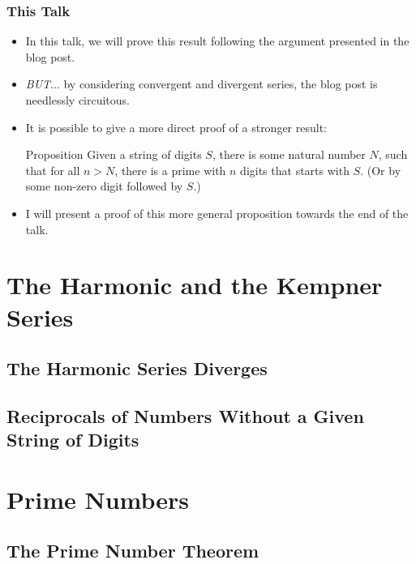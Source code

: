 \documentclass{beamer}
\begin{document}
\begin{frame}
    \frametitle{This Talk}

    \begin{itemize}
        \item In this talk, we will prove this result following the argument presented in the blog post. \pause
        \item \emph{BUT}... by considering convergent and divergent series, the blog post is needlessly circuitous. \pause
        \item It is possible to give a more direct proof of a stronger result:
        \begin{block}{Proposition}
            Given a string of digits $S$, there is some natural number $N$, such that for all $n > N$, there is a prime with $n$ digits that starts with $S$. (Or by some non-zero digit followed by $S$.)
        \end{block} \pause
        \item I will present a proof of this more general proposition towards the end of the talk.
    \end{itemize}    

\end{frame}

\section{The Harmonic and the Kempner Series}
\subsection{The Harmonic Series Diverges}
\subsection{Reciprocals of Numbers Without a Given String of Digits}

\section{Prime Numbers}
\subsection{The Prime Number Theorem}
\end{document}
